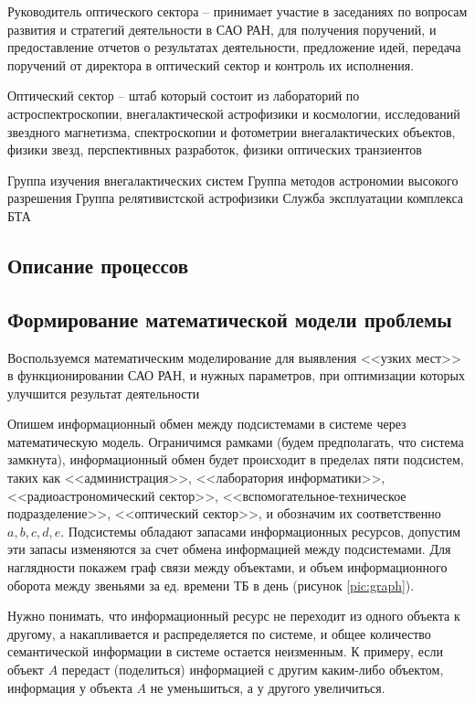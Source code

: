 Руководитель оптического сектора -- принимает участие в заседаниях по вопросам развития и стратегий деятельности в САО РАН, для получения поручений, и предоставление отчетов о результатах деятельности, предложение идей, передача поручений от директора в оптический сектор и контроль их исполнения.

Оптический сектор --  штаб который состоит из лабораторий по астроспектроскопии, внегалактической астрофизики и космологии, исследований звездного магнетизма, спектроскопии и фотометрии внегалактических объектов, физики звезд, перспективных разработок, физики оптических транзиентов

Группа изучения внегалактических систем
Группа методов астрономии высокого разрешения
Группа релятивистской астрофизики
Служба эксплуатации комплекса БТА 
\subsection{Описание процессов}

\subsection{Формирование математической модели проблемы}
Воспользуемся математическим моделирование для выявления <<узких мест>> в функционировании САО РАН, и нужных параметров, при оптимизации которых улучшится результат деятельности

Опишем информационный обмен между подсистемами в системе через математическую модель. Ограничимся рамками (будем предполагать, что система замкнута), информационный обмен будет  происходит в пределах пяти подсистем, таких как <<администрация>>, <<лаборатория информатики>>, <<радиоастрономический сектор>>, <<вспомогательное-техническое подразделение>>, <<оптический сектор>>, и обозначим их соответственно $a, b, c, d, e$. Подсистемы обладают запасами информационных ресурсов, допустим эти запасы изменяются за счет обмена информацией между подсистемами. Для наглядности покажем граф связи между объектами, и объем информационного оборота между звеньями за ед. времени ТБ в день (рисунок \ref{pic:graph}).




Нужно понимать, что информационный ресурс не переходит из одного объекта к другому, а накапливается и распределяется по системе, и общее количество семантической информации в системе остается неизменным. К примеру, если объект $A$ передаст (поделиться) информацией с другим каким-либо объектом, информация у объекта $A$ не уменьшиться, а у другого увеличиться.

